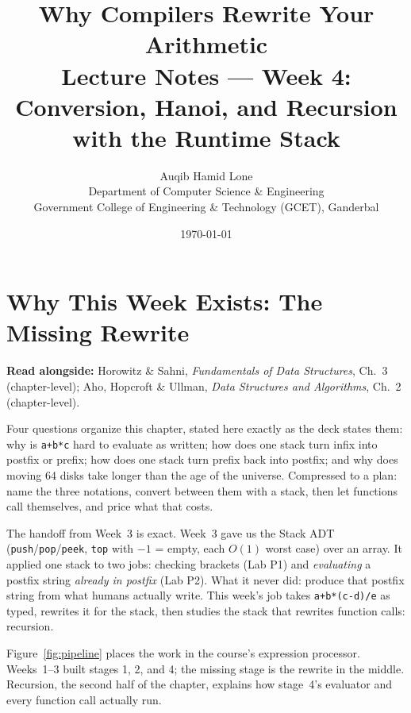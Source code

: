 \documentclass[11pt]{article}
\title{Why Compilers Rewrite Your Arithmetic\\\large Lecture Notes --- Week 4: Conversion, Hanoi, and Recursion with the Runtime Stack}
\author{Auqib Hamid Lone\\[0.3em]
  \small Department of Computer Science \& Engineering\\
  \small Government College of Engineering \& Technology (GCET), Ganderbal}
\date{\today}
\begin{document}
\maketitle

\section{Why This Week Exists: The Missing Rewrite}

\textbf{Read alongside:} Horowitz \& Sahni, \textit{Fundamentals of Data Structures}, Ch.~3 (chapter-level); Aho, Hopcroft \& Ullman, \textit{Data Structures and Algorithms}, Ch.~2 (chapter-level).

Four questions organize this chapter, stated here exactly as the deck states them: why is \texttt{a+b*c} hard to evaluate as written; how does one stack turn infix into postfix or prefix; how does one stack turn prefix back into postfix; and why does moving 64 disks take longer than the age of the universe. Compressed to a plan: name the three notations, convert between them with a stack, then let functions call themselves, and price what that costs.

The handoff from Week~3 is exact. Week~3 gave us the Stack ADT (\texttt{push}/\texttt{pop}/\texttt{peek}, \texttt{top} with $-1$ = empty, each $O(1)$ worst case) over an array. It applied one stack to two jobs: checking brackets (Lab P1) and \emph{evaluating} a postfix string \emph{already in postfix} (Lab P2). What it never did: produce that postfix string from what humans actually write. This week's job takes \texttt{a+b*(c-d)/e} as typed, rewrites it for the stack, then studies the stack that rewrites function calls: recursion.

Figure~\ref{fig:pipeline} places the work in the course's expression processor. Weeks~1--3 built stages 1, 2, and 4; the missing stage is the rewrite in the middle. Recursion, the second half of the chapter, explains how stage~4's evaluator and every function call actually run. 
\end{document}
